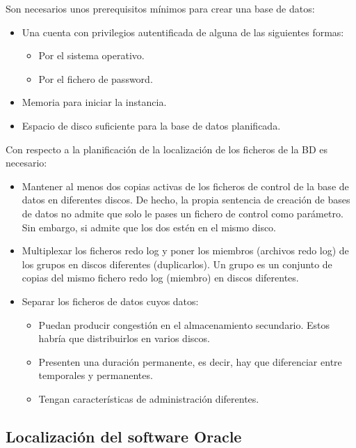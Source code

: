 Son necesarios unos prerequisitos mínimos para crear una base de datos:
\begin{itemize}
\item Una cuenta con privilegios autentificada de alguna de las siguientes formas:
\begin{itemize}
\item Por el sistema operativo.
\item Por el fichero de password.
\end{itemize}
\item Memoria para iniciar la instancia.
\item Espacio de disco suficiente para la base de datos planificada.
\end{itemize}

Con respecto a la planificación de la localización de los ficheros de la BD es necesario:
\begin{itemize}
\item Mantener al menos dos copias activas de los ficheros de control de la base de datos en diferentes discos. De hecho, la propia sentencia de creación de bases de datos no admite que solo le pases un fichero de control como parámetro. Sin embargo, si admite que los dos estén en el mismo disco.
\item Multiplexar los ficheros redo log y poner los miembros (archivos redo log) de los grupos en discos diferentes (duplicarlos). Un grupo es un conjunto de copias del mismo fichero redo log (miembro) en discos diferentes.
\item Separar los ficheros de datos cuyos datos:
\begin{itemize}
\item Puedan producir congestión en el almacenamiento secundario. Estos habría que distribuirlos en varios discos.
\item Presenten una duración permanente, es decir, hay que diferenciar entre temporales y permanentes.
\item Tengan características de administración diferentes.
\end{itemize}
\end{itemize}

\subsection{Localización del software Oracle}


